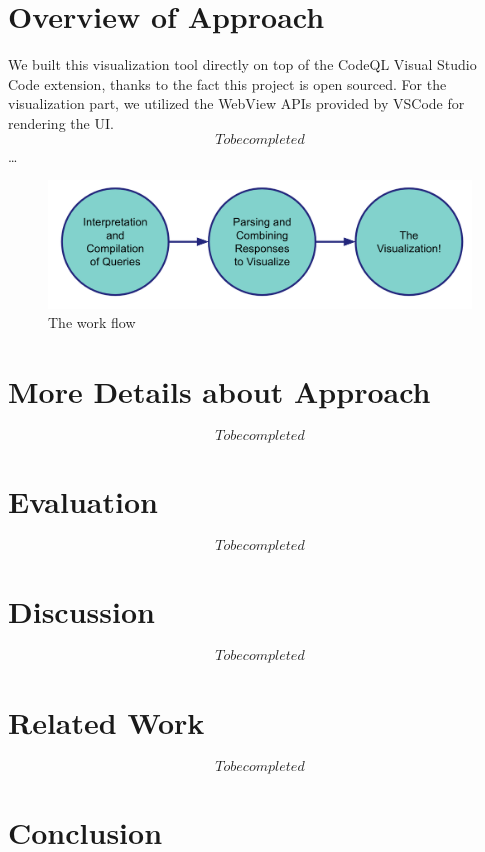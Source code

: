 \documentclass[sigplan,10pt,review]{acmart}
\begin{document}
\section{Overview of Approach}
We built this visualization tool directly on top of the CodeQL Visual Studio Code extension, thanks to the fact this project is open sourced. For the visualization part, we utilized the WebView APIs provided by VSCode for rendering the UI. \[To be completed\] \dots

\begin{figure}[h]
  \centering
  \includegraphics[width=\linewidth]{work_flow}
  \caption{The work flow}
\end{figure}

\section{More Details about Approach}
\[To be completed\] 
\section{Evaluation}
\[To be completed\] 
\section{Discussion}
\[To be completed\] 
\section{Related Work}
\[To be completed\] 
\section{Conclusion}
\end{document}
